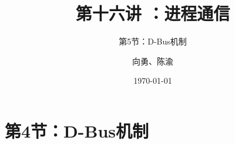 


\title[第16讲]{第十六讲 ：进程通信} %
\subtitle{第5节：D-Bus机制}
\author{向勇、陈渝} %
\date{\today} %



\begin{frame}
\titlepage %
\end{frame}

\section{第4节：D-Bus机制} %
